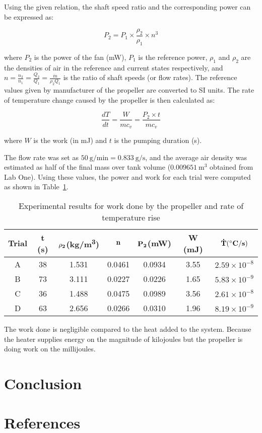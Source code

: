 \documentclass[12pt]{article}
\begin{document}
Using the given relation, the shaft speed ratio and the corresponding power can be expressed as:

\begin{equation}
    P_{2} = P_{1} \times \frac{\rho_{2}}{\rho_{1}} \times n^{3}
\end{equation}

where \( P_{2} \) is the power of the fan (mW), \( P_{1} \) is the reference power, \( \rho_{1} \) and \( \rho_{2} \) are the densities of air in the reference and current states respectively, and \( n = \frac{n_{2}}{n_{1}} = \frac{Q_{2}}{Q_{1}} = \frac{\dot m}{\rho_2 Q_1}\) is the ratio of shaft speeds (or flow rates).  The reference values given by manufacturer of the propeller are converted to SI units.
The rate of temperature change caused by the propeller is then calculated as:

\begin{equation}
    \frac{dT}{dt} = \frac{W}{mc_v} = \frac{P_{2} \times t}{mc_v}
\end{equation}

where \( W \) is the work (in mJ) and \( t \) is the pumping duration (s).

The flow rate was set as \( 50~\text{g/min} = 0.833~\text{g/s} \), and the average air density was estimated as half of the final mass over tank volume (\( 0.009651~\text{m}^{3} \) obtained from Lab One). Using these values, the power and work for each trial were computed as shown in Table~\ref{tab:results}.

\begin{table}[h!]
\centering
\caption{Experimental results for work done by the propeller and rate of temperature rise}
\label{tab:results}
\begin{tabular}{|c|c|c|c|c|c|c|}
\hline
\textbf{Trial} & \textbf{\bf t (s)} & \textbf{$\bf \rho_2$(kg/m\textsuperscript{3})} & \textbf{$\bf n$} & \textbf{$\bf P_2$(mW)} & \textbf{W (mJ)} & $\bf \dot T (^{\circ} C/s)$ \\ \hline
A & 38 & 1.531 & 0.0461 & 0.0934 & 3.55 & $2.59\times10^{-8}$\\ \hline
B & 73 & 3.111 & 0.0227 & 0.0226 & 1.65 & $5.83\times10^{-9}$\\ \hline
C & 36 & 1.488 & 0.0475 & 0.0989 & 3.56 & $2.61\times10^{-8}$\\ \hline
D & 63 & 2.656 & 0.0266 & 0.0310 & 1.96 & $8.19\times10^{-9}$\\ \hline
\end{tabular}
\end{table}

The work done is negligible compared to the heat added to the system. Because the heater supplies energy on the magnitude of kilojoules but the propeller is doing work on the millijoules.

\section{Conclusion}


\section{References}






\newpage
\begin{thebibliography}{9}

\end{thebibliography}
\end{document}
